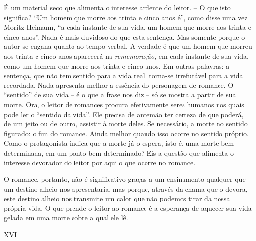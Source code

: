 É um material seco que alimenta o interesse ardente do leitor. -- O que
isto significa? ``Um homem que morre aos trinta e cinco anos é'', como
disse uma vez Moritz Heimann, ``a cada instante de sua vida, um homem
que morre aos trinta e cinco anos''. Nada é mais duvidoso do que esta
sentença. Mas somente porque o autor se engana quanto ao tempo verbal. A
verdade é que um homem que morreu aos trinta e cinco anos aparecerá na
\emph{rememoração}, em cada instante de sua vida, como um homem que
morre aos trinta e cinco anos. Em outras palavras: a sentença, que não
tem sentido para a vida real, torna-se irrefutável para a vida
recordada. Nada apresenta melhor a essência do personagem de romance. O
``sentido'' de sua vida -- é o que a frase nos diz -- só se mostra a
partir de sua morte. Ora, o leitor de romances procura efetivamente
seres humanos nos quais pode ler o ``sentido da vida''. Ele precisa de
antemão ter certeza de que poderá, de um jeito ou de outro, assistir à
morte deles. Se necessário, a morte no sentido figurado: o fim do
romance. Ainda melhor quando isso ocorre no sentido próprio. Como o
protagonista indica que a morte já o espera, isto é, uma morte bem
determinada, em um ponto bem determinado? Eis a questão que alimenta o
interesse devorador do leitor por aquilo que ocorre no romance.

O romance, portanto, não é significativo graças a um ensinamento
qualquer que um destino alheio nos apresentaria, mas porque, através da
chama que o devora, este destino alheio nos transmite um calor que não
podemos tirar da nossa própria vida. O que prende o leitor ao romance é
a esperança de aquecer sua vida gelada em uma morte sobre a qual ele lê.

XVI

